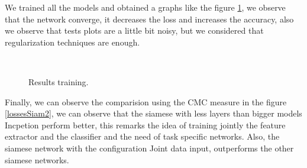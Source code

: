 \documentclass[12pt, a4paper, titlepage,twoside,openright]{article}
\begin{document}
We trained all the models and obtained a graphs like the figure \ref{lossesSiam}, we observe that the network converge, it decreases the loss and increases the accuracy, also we observe that tests plots are a little bit noisy, but we considered that regularization techniques are enough.

\begin{figure}[H]
		
\centering

\\

\caption{Results training.}
\label{lossesSiam}
\end{figure}



Finally, we can observe the comparision using the CMC measure in the figure \ref{lossesSiam2}, we can observe that the siamese with less layers than bigger models Incpetion perform better, this remarks the idea of training jointly the feature extractor and the classifier and the need of task specific networks. Also, the siamese network with the configuration Joint data input, outperforms the other siamese networks.
\end{document}

